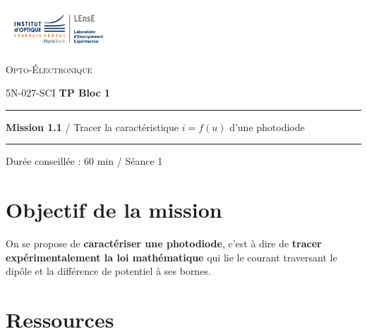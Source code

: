 \newpage

\begin{minipage}[c]{.25\linewidth}
	\includegraphics[width=4cm]{images/Logo-LEnsE.png}
\end{minipage} \hfill
\begin{minipage}[c]{.4\linewidth}

\begin{center}
\vspace{0.3cm}
{\Large \textsc{Opto-Électronique}}

\medskip

5N-027-SCI \qquad \textbf{\Large TP Bloc 1}

\end{center}
\end{minipage}\hfill

\vspace{0.5cm}

\noindent \rule{\linewidth}{1pt}

{\noindent\Large \rule[-7pt]{0pt}{30pt} \textbf{Mission 1.1} / Tracer la caractéristique $i = f(u)$ d'une photodiode} 

\noindent \rule{\linewidth}{1pt}

\vspace{-0.5cm}

\begin{center}

Durée conseillée : 60 min / Séance 1

\end{center}

\section{Objectif de la mission}
\label{mission11}

On se propose de \textbf{caractériser une photodiode}, c'est à dire de \textbf{tracer expérimentalement la loi mathématique} qui lie le courant traversant le dipôle et la différence de potentiel à ses bornes.


\section{Ressources}

